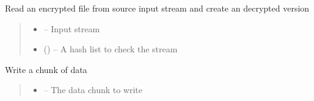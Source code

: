 \documentclass[letterpaper,10pt,english]{sphinxmanual}
\begin{document}
\begin{savenotes}
\begin{fulllineitems}
\begin{savenotes}\begin{fulllineitems}
\label{\detokenize{eezz:eezz.filesrv.TEezzFile.read}}
\pysigstartsignatures
{}
\pysigstopsignatures
\sphinxAtStartPar
Read an encrypted file from source input stream and create an decrypted version
\begin{quote}\begin{description}
\begin{itemize}
\item {} 
\sphinxAtStartPar
{} – Input stream

\item {} 
\sphinxAtStartPar
{} (\sphinxstyleliteralemphasis{\sphinxupquote{{[}}}\sphinxstyleliteralemphasis{\sphinxupquote{{]}}}) – A hash list to check the stream

\end{itemize}

\end{description}\end{quote}

\end{fulllineitems}\end{savenotes}


\begin{savenotes}\begin{fulllineitems}
\label{\detokenize{eezz:eezz.filesrv.TEezzFile.write}}
\pysigstartsignatures
{}
\pysigstopsignatures
\sphinxAtStartPar
Write a chunk of data
\begin{quote}\begin{description}
\begin{itemize}
\item {} 
\sphinxAtStartPar
{} – The data chunk to write


\end{itemize}
\end{description}
\end{quote}
\end{fulllineitems}
\end{savenotes}
\end{fulllineitems}
\end{savenotes}
\end{document}
